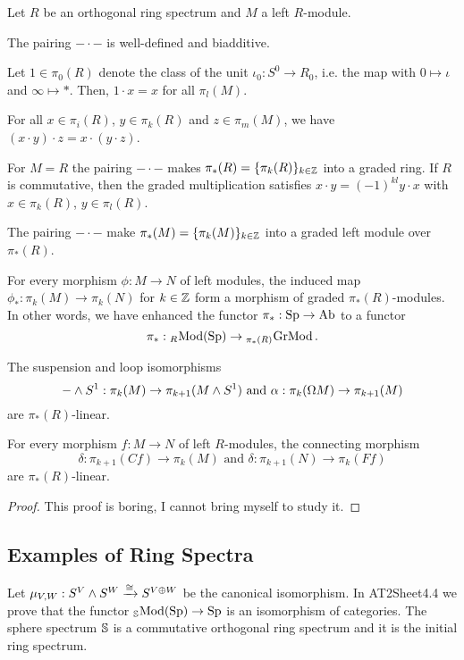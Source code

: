 \begin{theorem}
Let $R$ be an orthogonal ring spectrum and $M$ a left $R$-module.
\begin{rmnumerate}
    \item The pairing $-\cdot-$ is well-defined and biadditive.
    \item Let $1\in\pi_0(R)$ denote the class of the unit $\iota_0:S^0\to R_0$, i.e. the map with $0\mapsto\iota$ and $\infty\mapsto*$. Then, $1\cdot x=x$ for all $\pi_l(M)$.
    \item For all $x\in\pi_i(R)$, $y\in\pi_k(R)$ and $z\in\pi_m(M)$, we have $(x\cdot y)\cdot z=x\cdot(y\cdot z)$.
    \item For $M=R$ the pairing $-\cdot-$ makes $\pi_*(R)=\{\pi_k(R)\}_{k\in{\mathbb Z}}$ into a graded ring. If $R$ is commutative, then the graded multiplication satisfies $x\cdot y=(-1)^{kl}y\cdot x$ with $x\in\pi_k(R)$, $y\in\pi_l(R)$.
    \item The pairing $-\cdot-$ make $\pi_*(M)=\{\pi_k(M)\}_{k\in{\mathbb Z}}$ into a graded left module over $\pi_*(R)$.
    \item For every morphism $\phi:M\to N$ of left modules, the induced map $\phi_*:\pi_k(M)\to\pi_k(N)$ for $k\in{\mathbb Z}$ form a morphism of graded $\pi_*(R)$-modules. In other words, we have enhanced the functor $\pi_*:{\normalfont\textup{Sp}}\to{\normalfont\textup{Ab}}$ to a functor
    \[\pi_*:{}_{R\!}\operatorname{Mod}({\normalfont\textup{Sp}})\to{}_{\pi_*(R)\!}\operatorname{GrMod}.\]
    \item The suspension and loop isomorphisms
    \[-\wedge S^1:\pi_k(M)\to\pi_{k+1}(M\wedge S^1)\text{ and }\alpha:\pi_k(\Omega M)\to\pi_{k+1}(M)\]
    are $\pi_*(R)$-linear.
    \item For every morphism $f:M\to N$ of left $R$-modules, the connecting morphism
    \[\delta:\pi_{k+1}(Cf)\to\pi_k(M)\text{ and }\delta:\pi_{k+1}(N)\to\pi_k(Ff)\]
    are $\pi_*(R)$-linear.
\end{rmnumerate}
\end{theorem}

\begin{proof}
This proof is  boring, I cannot bring myself to study it.
\end{proof}

\subsection{Examples of Ring Spectra}

\begin{example}
Let $\mu_{V,W}:S^V\wedge S^W\xrightarrow{\cong}S^{V\oplus W}$ be the canonical isomorphism. In AT2Sheet4.4 we prove that the functor ${}_{\mathbb{S}\!}\operatorname{Mod}({\normalfont\textup{Sp}})\to{\normalfont\textup{Sp}}$ is an isomorphism of categories. The sphere spectrum $\mathbb{S}$ is a commutative orthogonal ring spectrum and it is the initial ring spectrum.
\end{example}


